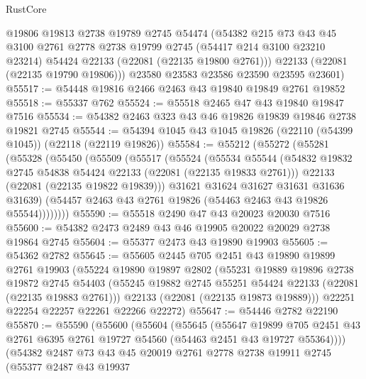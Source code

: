 \begin{lexlean}{RustCore}
\begin{coremodule}
        @19806
        @19813
        @2738
        @19789
        @2745
        @54474
        (@54382
          @215
          @73
          @43
          @45
          @3100
          @2761
          @2778
          @2738
          @19799
          @2745
          (@54417 @214 @3100 @23210 @23214)
          @54424
          @22133
          (@22081 (@22135 @19800 @2761)))
        @22133
        (@22081 (@22135 @19790 @19806)))
      @23580
      @23583
      @23586
      @23590
      @23595
      @23601)
@55517 := @54448 @19816 @2466 @2463 @43 @19840 @19849 @2761 @19852
@55518 := @55337 @762
@55524 := @55518 @2465 @47 @43 @19840 @19847 @7516
@55534 := @54382 @2463 @323 @43 @46 @19826 @19839 @19846 @2738 @19821 @2745
@55544 := @54394 @1045 @43 @1045 @19826 (@22110 (@54399 @1045)) (@22118 (@22119 @19826))
@55584 := @55212
    (@55272
      (@55281
        (@55328
          (@55450
            (@55509
              (@55517
                (@55524
                  (@55534
                    @55544
                    (@54832 @19832 @2745 @54838 @54424 @22133 (@22081 (@22135 @19833 @2761)))
                    @22133
                    (@22081 (@22135 @19822 @19839)))
                  @31621
                  @31624
                  @31627
                  @31631
                  @31636
                  @31639)
                (@54457 @2463 @43 @2761 @19826 (@54463 @2463 @43 @19826 @55544))))))))
@55590 := @55518 @2490 @47 @43 @20023 @20030 @7516
@55600 := @54382 @2473 @2489 @43 @46 @19905 @20022 @20029 @2738 @19864 @2745
@55604 := @55377 @2473 @43 @19890 @19903
@55605 := @54362 @2782
@55645 := @55605
    @2445
    @705
    @2451
    @43
    @19890
    @19899
    @2761
    @19903
    (@55224
      @19890
      @19897
      @2802
      (@55231
        @19889
        @19896
        @2738
        @19872
        @2745
        @54403
        (@55245 @19882 @2745 @55251 @54424 @22133 (@22081 (@22135 @19883 @2761)))
        @22133
        (@22081 (@22135 @19873 @19889)))
      @22251
      @22254
      @22257
      @22261
      @22266
      @22272)
@55647 := @54446 @2782 @22190
@55870 := @55590
    (@55600
      (@55604
        (@55645
          (@55647
            @19899
            @705
            @2451
            @43
            @2761
            @6395
            @2761
            @19727
            @54560
            (@54463 @2451 @43 @19727 @55364))))
      (@54382
        @2487
        @73
        @43
        @45
        @20019
        @2761
        @2778
        @2738
        @19911
        @2745
        (@55377
          @2487
          @43
          @19937

\end{coremodule}
\end{lexlean}

